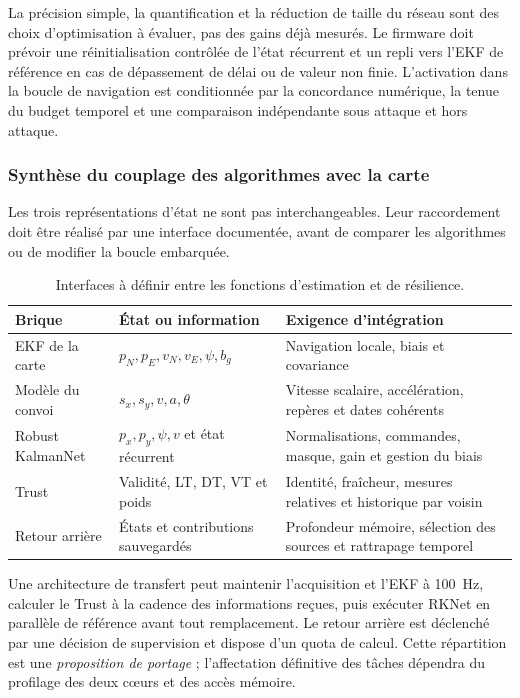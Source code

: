 \documentclass[11pt,a4paper]{article}
\begin{document}
La précision simple, la quantification et la réduction de taille du réseau sont des choix d'optimisation à évaluer, pas des gains déjà mesurés. Le firmware doit prévoir une réinitialisation contrôlée de l'état récurrent et un repli vers l'EKF de référence en cas de dépassement de délai ou de valeur non finie. L'activation dans la boucle de navigation est conditionnée par la concordance numérique, la tenue du budget temporel et une comparaison indépendante sous attaque et hors attaque.
\FloatBarrier

\subsubsection{Synthèse du couplage des algorithmes avec la carte}

Les trois représentations d'état ne sont pas interchangeables. Leur raccordement doit être réalisé par une interface documentée, avant de comparer les algorithmes ou de modifier la boucle embarquée.

\begin{table}[!htbp]\centering\small
\begin{tabularx}{\linewidth}{|L{3.0cm}|L{4.8cm}|Y|}\hline
{}\textbf{Brique} & \textbf{État ou information} & \textbf{Exigence d'intégration}\\\hline
EKF de la carte & $p_N,p_E,v_N,v_E,\psi,b_g$ & Navigation locale, biais et covariance\\\hline
Modèle du convoi & $s_x,s_y,v,a,\theta$ & Vitesse scalaire, accélération, repères et dates cohérents\\\hline
Robust KalmanNet & $p_x,p_y,\psi,v$ et état récurrent & Normalisations, commandes, masque, gain et gestion du biais\\\hline
Trust & Validité, LT, DT, VT et poids & Identité, fraîcheur, mesures relatives et historique par voisin\\\hline
Retour arrière & États et contributions sauvegardés & Profondeur mémoire, sélection des sources et rattrapage temporel\\\hline
\end{tabularx}
\caption{Interfaces à définir entre les fonctions d'estimation et de résilience.}
\end{table}

Une architecture de transfert peut maintenir l'acquisition et l'EKF à 100~Hz, calculer le Trust à la cadence des informations reçues, puis exécuter RKNet en parallèle de référence avant tout remplacement. Le retour arrière est déclenché par une décision de supervision et dispose d'un quota de calcul. Cette répartition est une \emph{proposition de portage} ; l'affectation définitive des tâches dépendra du profilage des deux cœurs et des accès mémoire.
\end{document}

